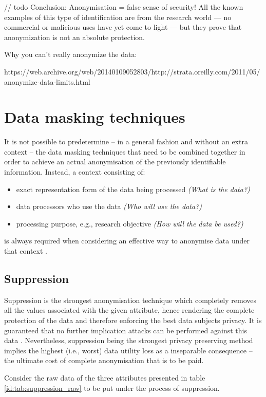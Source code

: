 \documentclass[a4paper,twoside,12pt]{book}
\begin{document}
// todo
Conclusion: Anonymisation = false sense of security! All the known examples of this type of identification are from the research world — no commercial or malicious uses have yet come to light — but they prove that anonymization is not an absolute protection.
\normalsize

Why you can't really anonymize the data:

https://web.archive.org/web/20140109052803/http://strata.oreilly.com/2011/05/anonymize-data-limits.html
\color{black}


\section{Data masking techniques}

It is not possible to predetermine – in a general fashion and without an extra context – the data masking techniques that need to be combined together in order to achieve an actual anonymisation of the previously identifiable information. Instead, a context consisting of:
\begin{itemize}
	\item exact representation form of the data being processed \textit{(What is the data?)}
	\item data processors who use the data \textit{(Who will use the data?)}
	\item processing purpose, e.g., research objective \textit{(How will the data be used?)}
\end{itemize}
is always required when considering an effective way to anonymise data under that context \cite{bib:anonymizing_health_data}.

\subsection{Suppression}

Suppression is the strongest anonymisation technique which completely removes all the values associated with the given attribute, hence rendering the complete protection of the data and therefore enforcing the best data subjects privacy. It is guaranteed that no further implication attacks can be performed against this data \cite{bib:anonymization_extensive_study}. Nevertheless, suppression being the strongest privacy preserving method implies the highest (i.e., worst) data utility loss as a inseparable consequence – the ultimate cost of complete anonymisation that is to be paid.

Consider the raw data of the three attributes presented in table \ref{id:tab:suppression_raw} to be put under the process of suppression.
\end{document}
